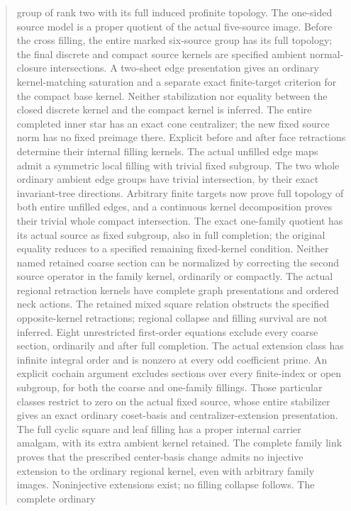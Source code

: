 \documentclass[11pt,a4paper]{article}
\begin{document}
\begin{abstract}
group of rank two with its full induced profinite topology. The one-sided
source model is a proper quotient of the actual five-source image.
Before the cross filling, the entire marked six-source group has its
full topology; the final discrete and compact source kernels are specified
ambient normal-closure intersections. A two-sheet edge presentation gives
an ordinary kernel-matching saturation and a separate exact finite-target
criterion for the compact base kernel. Neither stabilization nor equality
between the closed discrete kernel and the compact kernel is inferred.
The entire completed inner star has an exact cone centralizer;
the new fixed source norm has no fixed preimage there. Explicit before
and after face retractions determine their internal filling kernels.
The actual unfilled edge maps admit a symmetric local filling with
trivial fixed subgroup. The two whole ordinary ambient edge groups have
trivial intersection, by their exact invariant-tree directions.
Arbitrary finite targets now prove full topology of both entire
unfilled edges, and a continuous kernel decomposition proves their
trivial whole compact intersection. The exact one-family quotient has
its actual source as fixed subgroup, also in full completion; the
original equality reduces to a specified remaining fixed-kernel
condition. Neither named retained coarse section can be normalized by
correcting the second source operator in the family kernel, ordinarily
or compactly. The actual regional retraction kernels have complete
graph presentations and ordered neck actions. The retained mixed square
relation obstructs the specified opposite-kernel retractions; regional
collapse and filling survival are not inferred. Eight unrestricted first-order
equations exclude every coarse section, ordinarily and after full
completion. The actual extension class has infinite integral order and
is nonzero at every odd coefficient prime. An explicit cochain argument
excludes sections over every finite-index or open subgroup, for both
the coarse and one-family fillings. Those particular classes restrict
to zero on the actual fixed source, whose entire stabilizer gives an
exact ordinary coset-basis and centralizer-extension presentation.
The full cyclic square and leaf filling has a proper internal carrier
amalgam, with its extra ambient kernel retained. The complete family
link proves that the prescribed center-basis change admits no injective
extension to the ordinary regional kernel, even with arbitrary family
images. Noninjective extensions exist; no filling collapse follows. The complete ordinary

\end{abstract}
\end{document}
